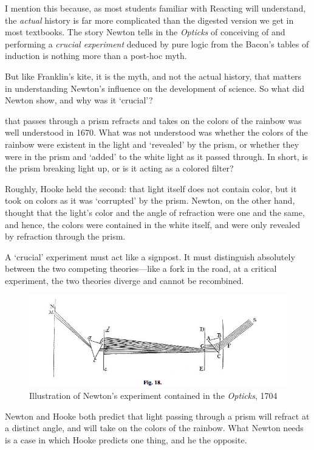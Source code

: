 \begin{refsection}
I mention this because, as most students familiar with Reacting will understand, the \emph{actual} history is far more complicated than the digested version we get in most textbooks. The story Newton tells in the \emph{Opticks} of conceiving of and performing a \emph{crucial experiment} deduced by pure logic from the Bacon's tables of induction is nothing more than a post-hoc myth.

But like Franklin's kite, it is the myth, and not the actual history, that matters in understanding Newton's influence on the development of science. So what did Newton show, and why was it `crucial'?

 that passes through a prism refracts and takes on the colors of the rainbow was well understood in 1670. What was not understood was whether the colors of the rainbow were existent in the light and `revealed' by the prism, or whether they were in the prism and `added' to the white light as it passed through. In short, is the prism breaking light up, or is it acting as a colored filter?

Roughly, Hooke held the second: that light itself does not contain color, but it took on colors as it was `corrupted' by the prism. Newton, on the other hand, thought that the light's color and the angle of refraction were one and the same, and hence, the colors were contained in the white itself, and were only revealed by refraction through the prism.

A `crucial' experiment must act like a signpost. It must distinguish absolutely between the two competing theories---like a fork in the road, at a critical experiment, the two theories diverge and cannot be recombined.
\begin{figure}\includegraphics{../images/newton1704.png}\caption{Illustration of Newton's experiment contained in the \emph{Opticks}, 1704}\label{fig:newton1704}\end{figure}

Newton and Hooke both predict that light passing through a prism will refract at a distinct angle, and will take on the colors of the rainbow. What Newton needs is a case in which Hooke predicts one thing, and he the opposite. 


\end{refsection}
